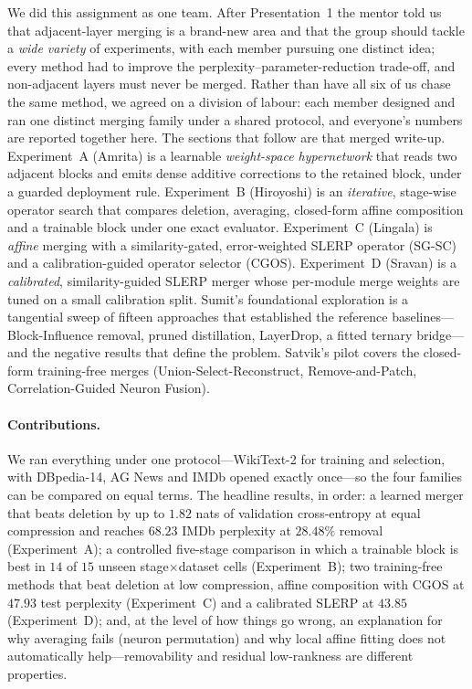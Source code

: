 \documentclass[10pt,a4paper]{article}
\begin{document}
We did this assignment as one team. After Presentation~1 the mentor told us
that adjacent-layer merging is a brand-new area and that the group should
tackle a \emph{wide variety} of experiments, with each member pursuing one
distinct idea; every method had to improve the perplexity--parameter-reduction
trade-off, and non-adjacent layers must never be merged. Rather than have all
six of us chase the same method, we agreed on a division of labour: each
member designed and ran one distinct merging family under a shared protocol,
and everyone's numbers are reported together here. The sections that follow
are that merged write-up. Experiment~A (Amrita) is a learnable
\emph{weight-space hypernetwork} that reads two adjacent blocks and emits dense
additive corrections to the retained block, under a guarded deployment rule.
Experiment~B (Hiroyoshi) is an \emph{iterative}, stage-wise operator search
that compares deletion, averaging, closed-form affine composition and a
trainable block under one exact evaluator. Experiment~C (Lingala) is
\emph{affine} merging with a similarity-gated, error-weighted SLERP operator
(SG-SC) and a calibration-guided operator selector (CGOS). Experiment~D
(Sravan) is a \emph{calibrated}, similarity-guided SLERP merger whose
per-module merge weights are tuned on a small calibration split. Sumit's
foundational exploration is a tangential sweep of fifteen approaches that
established the reference baselines---Block-Influence removal, pruned
distillation, LayerDrop, a fitted ternary bridge---and the negative results
that define the problem. Satvik's pilot covers the closed-form training-free
merges (Union-Select-Reconstruct, Remove-and-Patch, Correlation-Guided Neuron
Fusion).

\paragraph{Contributions.}
We ran everything under one protocol---WikiText-2 for training and selection,
with DBpedia-14, AG News and IMDb opened exactly once---so the four families
can be compared on equal terms. The headline results, in order: a learned
merger that beats deletion by up to $1.82$ nats of validation cross-entropy at
equal compression and reaches $68.23$ IMDb perplexity at $28.48\%$ removal
(Experiment~A); a controlled five-stage comparison in which a trainable block
is best in $14$ of $15$ unseen stage$\times$dataset cells (Experiment~B); two
training-free methods that beat deletion at low compression, affine
composition with CGOS at $47.93$ test perplexity (Experiment~C) and a
calibrated SLERP at $43.85$ (Experiment~D); and, at the level of how things go
wrong, an explanation for why averaging fails (neuron permutation) and why
local affine fitting does not automatically help---removability and residual
low-rankness are different properties.
\end{document}
